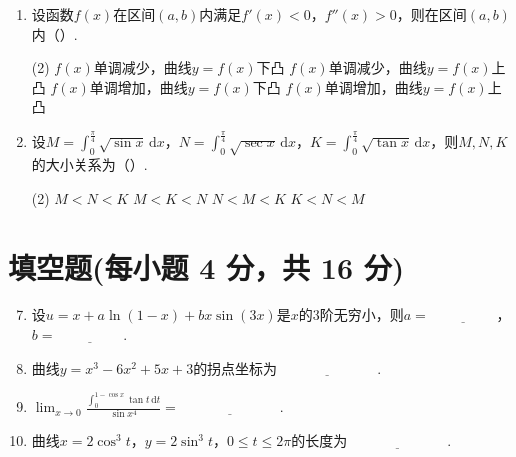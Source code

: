 \documentclass[../Main.tex]{subfiles}
\begin{document}
\begin{enumerate}
    \item 设函数$f(x)$在区间$(a,b)$内满足$f'(x)<0$，$f''(x)>0$，则在区间$(a,b)$内（\qquad）.

          \begin{tasks}[label=\textbf{\Alph*.}, label-width=1.5em, column-sep=1em](2)
              \task $f(x)$单调减少，曲线$y=f(x)$下凸
              \task $f(x)$单调减少，曲线$y=f(x)$上凸
              \task $f(x)$单调增加，曲线$y=f(x)$下凸
              \task $f(x)$单调增加，曲线$y=f(x)$上凸
          \end{tasks}
          \vspace{1em}

    \item 设$M=\int_{0}^{\frac{\pi}{4}}\sqrt{\sin x}\,\mathrm{d}x$，$N=\int_{0}^{\frac{\pi}{4}}
              \sqrt{\sec x}\,\mathrm{d}x$，$K=\int_{0}^{\frac{\pi}{4}}\sqrt{\tan x}\,\mathrm{d}
              x$，则$M,N,K$的大小关系为（\qquad）.

          \begin{tasks}[label=\textbf{\Alph*.}, label-width=1.5em, column-sep=1em](2)
              \task $M<N<K$
              \task $M<K<N$
              \task $N<M<K$
              \task $K<N<M$
          \end{tasks}
          \vspace{1em}
\end{enumerate}

\section{填空题(每小题 4 分，共 16 分)}
\begin{enumerate}
    \setcounter{enumi}{6}
    \item 设$u=x+a\ln(1-x)+bx\sin(3x)$是$x$的$3$阶无穷小，则$a=\underline{\hspace{2cm}
              }$，$b=\underline{\hspace{2cm}}$.
          \vspace{0.5em}

    \item 曲线$y=x^{3}-6x^{2}+5x+3$的拐点坐标为$\underline{\hspace{3cm}}$.
          \vspace{0.5em}

    \item $\lim_{x\to0}\frac{\displaystyle\int_{0}^{1-\cos x}\tan t\,\mathrm{d}t}{\sin
                  x^{4}}=\underline{\hspace{3cm}}$.
          \vspace{0.5em}

    \item 曲线$x=2\cos^{3} t$，$y=2\sin^{3} t$，$0\leq t \leq 2\pi$的长度为$\underline
              {\hspace{3cm}}$.
\end{enumerate}
\end{document}

